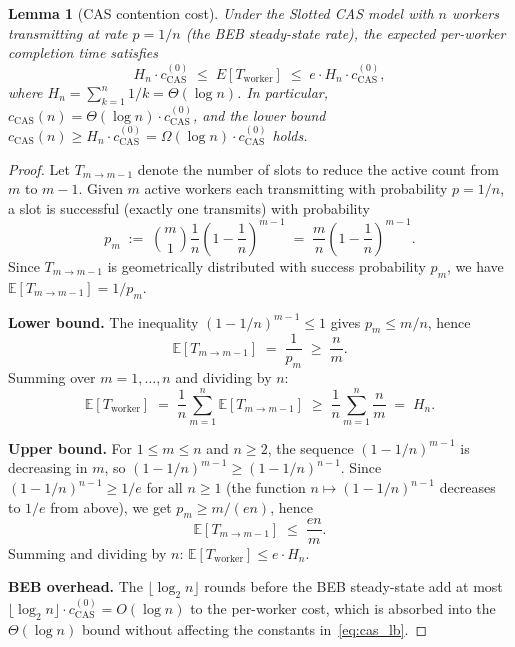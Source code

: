 \documentclass[11pt,a4paper]{report}
\newtheorem{lemma}[theorem]{Lemma}
\begin{document}
\begin{lemma}[CAS contention cost]\label{lem:cas_contention}
Under the Slotted CAS model with $n$ workers transmitting at rate
$p = 1/n$ (the BEB steady-state rate), the expected per-worker
completion time satisfies
\begin{equation}\label{eq:cas_lb}
  H_n \cdot c_{\mathrm{CAS}}^{(0)}
  \;\leq\;
  E[T_{\mathrm{worker}}]
  \;\leq\;
  e \cdot H_n \cdot c_{\mathrm{CAS}}^{(0)},
\end{equation}
where $H_n = \sum_{k=1}^n 1/k = \Theta(\log n)$.
In particular, $c_{\mathrm{CAS}}(n) = \Theta(\log n)\cdot c_{\mathrm{CAS}}^{(0)}$,
and the \emph{lower bound} $c_{\mathrm{CAS}}(n) \geq H_n\cdot c_{\mathrm{CAS}}^{(0)}
= \Omega(\log n)\cdot c_{\mathrm{CAS}}^{(0)}$ holds.
\end{lemma}

\begin{proof}
Let $T_{m\to m-1}$ denote the number of slots to reduce the active
count from $m$ to $m-1$.  Given $m$ active workers each transmitting
with probability $p = 1/n$, a slot is successful (exactly one transmits)
with probability
\[
  p_m
  \;:=\;
  \binom{m}{1}\frac{1}{n}\!\left(1-\frac{1}{n}\right)^{\!m-1}
  \;=\;
  \frac{m}{n}\!\left(1-\frac{1}{n}\right)^{\!m-1}.
\]
Since $T_{m\to m-1}$ is geometrically distributed with success
probability $p_m$, we have $\mathbb{E}[T_{m\to m-1}] = 1/p_m$.

\noindent\textbf{Lower bound.}
The inequality $(1-1/n)^{m-1} \leq 1$ gives $p_m \leq m/n$, hence
\[
  \mathbb{E}[T_{m\to m-1}]
  \;=\; \frac{1}{p_m}
  \;\geq\; \frac{n}{m}.
\]
Summing over $m = 1,\ldots,n$ and dividing by $n$:
\[
  \mathbb{E}[T_{\mathrm{worker}}]
  \;=\;
  \frac{1}{n}\sum_{m=1}^{n}\mathbb{E}[T_{m\to m-1}]
  \;\geq\;
  \frac{1}{n}\sum_{m=1}^{n}\frac{n}{m}
  \;=\;
  H_n.
\]

\noindent\textbf{Upper bound.}
For $1 \leq m \leq n$ and $n \geq 2$, the sequence $(1-1/n)^{m-1}$
is decreasing in $m$, so
$(1-1/n)^{m-1} \geq (1-1/n)^{n-1}$.
Since $(1-1/n)^{n-1} \geq 1/e$ for all $n \geq 1$
(the function $n\mapsto (1-1/n)^{n-1}$ decreases to $1/e$ from above),
we get $p_m \geq m/(en)$, hence
\[
  \mathbb{E}[T_{m\to m-1}]
  \;\leq\;
  \frac{en}{m}.
\]
Summing and dividing by $n$: $\mathbb{E}[T_{\mathrm{worker}}] \leq e\cdot H_n$.

\noindent\textbf{BEB overhead.}
The $\lfloor\log_2 n\rfloor$ rounds before the BEB steady-state add at
most $\lfloor\log_2 n\rfloor \cdot c_{\mathrm{CAS}}^{(0)} = O(\log n)$
to the per-worker cost, which is absorbed into the $\Theta(\log n)$
bound without affecting the constants in~\eqref{eq:cas_lb}.
\end{proof}
\end{document}
